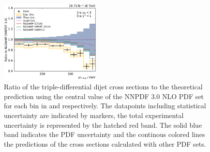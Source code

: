 \begin{figure}[htbp]
    \includegraphics[width=0.45\textwidth]{figures/measurement/ratio_to_NNPDF30+np_totcomp_yb2ys0.pdf}
    \caption[Ratio of the cross section to NNPDF 3.0 NLO]{
    Ratio of the triple-differential dijet cross sections to the theoretical
    prediction using the central value of the NNPDF 3.0 NLO PDF set for each bin in \ystar
    and \yboost respectively. The datapoints including statistical uncertainty are
    indicated by markers, the total experimental uncertainty is represented by the
    hatched red band. The solid blue band indicates the PDF uncertainty and the
    continous colored lines the predictions of the cross sections calculated with
    other PDF sets.}
    \label{fig:ratio_nnpdf30_nlo}
\end{figure}


